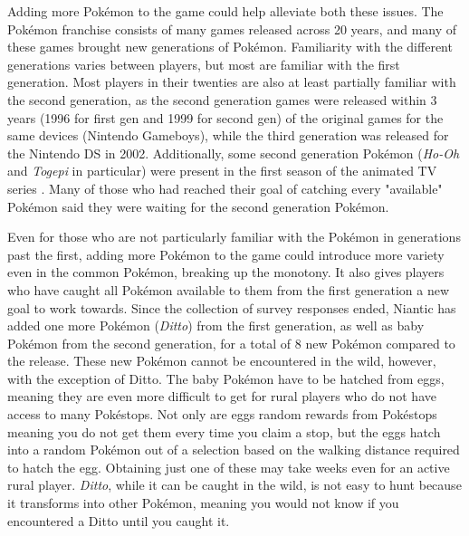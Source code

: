 Adding more Pokémon to the game could help alleviate both these issues. The Pokémon franchise consists of many games released across 20 years, and many of these games brought new generations of Pokémon. Familiarity with the different generations varies between players, but most are familiar with the first generation. Most players in their twenties are also at least partially familiar with the second generation, as the second generation games were released within 3 years (1996 for first gen and 1999 for second gen) of the original games for the same devices (Nintendo Gameboys), while the third generation was released for the Nintendo DS in 2002. Additionally, some second generation Pokémon (\emph{Ho-Oh} and \emph{Togepi} in particular) were present in the first season of the animated TV series . Many of those who had reached their goal of catching every "available" Pokémon said they were waiting for the second generation Pokémon.

Even for those who are not particularly familiar with the Pokémon in generations past the first, adding more Pokémon to the game could introduce more variety even in the common Pokémon, breaking up the monotony. It also gives players who have caught all Pokémon available to them from the first generation a new goal to work towards. Since the collection of survey responses ended, Niantic has added one more Pokémon (\emph{Ditto}) from the first generation, as well as baby Pokémon from the second generation, for a total of 8 new Pokémon compared to the release. These new Pokémon cannot be encountered in the wild, however, with the exception of Ditto. The baby Pokémon have to be hatched from eggs, meaning they are even more difficult to get for rural players who do not have access to many Pokéstops. Not only are eggs random rewards from Pokéstops meaning you do not get them every time you claim a stop, but the eggs hatch into a random Pokémon out of a selection based on the walking distance required to hatch the egg. Obtaining just one of these may take weeks even for an active rural player. \emph{Ditto}, while it can be caught in the wild, is not easy to hunt because it transforms into other Pokémon, meaning you would not know if you encountered a Ditto until you caught it.

